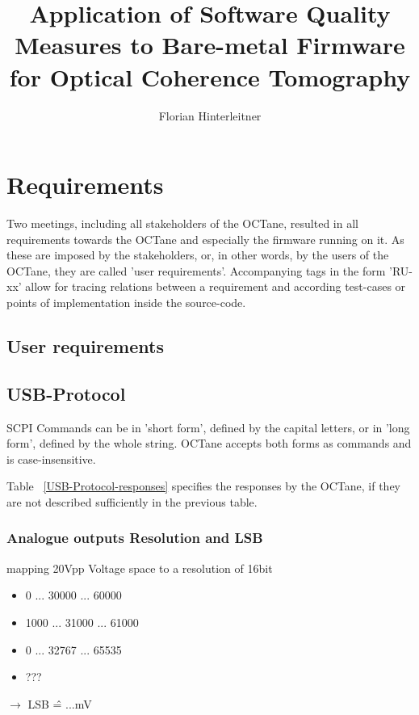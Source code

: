 \documentclass[master,english,smartquotes,apa]{hgbthesis}
\title{ Application of Software Quality Measures to Bare-metal Firmware for Optical Coherence Tomography}
\author{Florian Hinterleitner}
\begin{document}
\frontmatter                                   %
\maketitle

\tableofcontents

		
			
\mainmatter                                    %


% 

	
	\chapter{Requirements}
	\label{cha:Requirements}
		Two meetings, including all stakeholders of the OCTane, resulted in all requirements towards the OCTane and especially the firmware running on it. As these are imposed by the stakeholders, or, in other words, by the users of the OCTane, they are called 'user requirements'. Accompanying tags in the form 'RU-xx' allow for tracing relations between a requirement and according test-cases or points of implementation inside the source-code.
			\section{User requirements}
				
		\pagebreak
			\section{USB-Protocol}
		SCPI Commands can be in 'short form', defined by the capital letters, or in 'long form', defined by the whole string. OCTane accepts both forms as commands and is case-insensitive.

			{	\scriptsize
				
			}
			Table ~\ref{USB-Protocol-responses} specifies the responses by the OCTane, if they are not described sufficiently in the previous table.

			{	\scriptsize
				
			}
			
	\subsection{Analogue outputs Resolution and LSB}
	mapping 20Vpp Voltage space to a resolution of 16bit
	\begin{itemize}
		\item 0 ... 30000 ... 60000
		\item 1000 ... 31000 ... 61000
		\item 0 ... 32767 ... 65535
		\item ???
	\end{itemize}
	$\rightarrow$ LSB \^{=} ...mV
\end{document}
